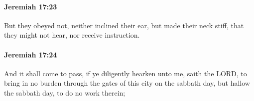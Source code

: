 		\paragraph{Jeremiah 17:23} %
			\label{JEREMIAH-17-23}

			But they obeyed not, neither inclined their ear, but made their neck stiff, that they might not hear, nor receive instruction.


		\paragraph{Jeremiah 17:24} %
			\label{JEREMIAH-17-24}

			And it shall come to pass, if ye diligently hearken unto me, saith the LORD, to bring in no burden through the gates of this city on the sabbath day, but hallow the sabbath day, to do no work therein;


